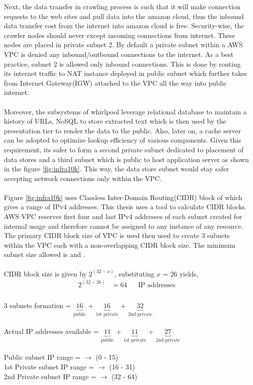 \noindent
Next, the data transfer in crawling process is such that it will make connection requests to the web sites and pull data into the amazon cloud, thus the inbound data transfer cost from the internet into amazon cloud is free. Security-wise, the crawler nodes should never except incoming connections from internet. These nodes are placed in private subnet 2. By default a private subnet within a AWS VPC is denied any inbound/outbound connections to the internet. As a best practice, subnet 2 is allowed only inbound connections. This is done by routing its internet traffic to NAT instance deployed in public subnet which further takes from Internet Gateway(IGW) attached to the VPC all the way into public internet.
\\
\\
\noindent
Moreover, the subsystems of whirlpool leverage relational database to maintain a history of URLs, NoSQL to
store extracted text which is then used by the presentation tier to render the data to the public. Also,
later on, a cache server can be adopted to optimize lookup efficiency of various components. Given this
requirement, its safer to form a second private subnet dedicated to placement of data stores and a third
subnet which is public to host application server as shown in the figure \ref{fig:infra10k}. This way, the data store subnet would stay safer accepting network connections only within the VPC.
\\
\\
\noindent
Figure \ref{fig:infra10k} uses Classless Inter-Domain Routing(CIDR) block of  which
gives a range of  IPv4 addresses. This thesis uses a tool \cite{cidr} to calculate CIDR
blocks. AWS VPC reserves first four and last IPv4 addresses of each subnet created for internal usage and
therefore cannot be assigned to any instance of any resource. The primary CIDR block size of VPC is used
then used to create 3 subnets within the VPC each with a non-overlapping CIDR block size. The minimum
subnet size allowed is  and .
\\
\\
CIDR block size is given by $2^{(32 - x)}$, substituting $x$ = 26 yields,
\begin{align*}
  2^{(32 - 26)} &= 64 && \text{IP addresses} \\
\end{align*}
\\
3 subnets formation = $\underbrace{16}_\text{public}$ + $\underbrace{16}_\text{1st private}$ + $\underbrace{32}_\text{2nd private}$
\\
\\
Actual IP addresses available = $\underbrace{11}_\text{public}$ + $\underbrace{11}_\text{1st private}$ + $\underbrace{27}_\text{2nd private}$
\\
\\
Public subnet IP range =  $\rightarrow$ (0 - 15)
\\                                                
1st Private subnet IP range =  $\rightarrow$ (16 - 31)
\\                                                
2nd Private subnet IP range =  $\rightarrow$ (32 - 64)